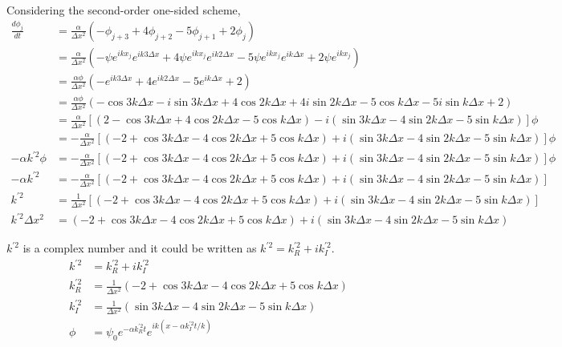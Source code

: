 \documentclass[letterpaper,10pt]{article}
\begin{document}
Considering the second-order one-sided scheme, 
\begin{align*}
  \frac{d\phi_j}{dt}&=\frac{\alpha}{\Delta x^2}\left(-\phi_{j+3}+4\phi_{j+2}-5\phi_{j+1}+2\phi_j\right)\\
  &=\frac{\alpha}{\Delta x^2}\left(-\psi e^{ikx_j}e^{ik3\Delta x}+4\psi e^{ikx_j}e^{ik2\Delta x}-5\psi e^{ikx_j}e^{ik\Delta x}+2\psi e^{ikx_j}\right)\\
  &=\frac{\alpha \phi}{\Delta x^2}\left(-e^{ik3\Delta x}+4e^{ik2\Delta x}-5e^{ik\Delta x}+2\right)\\
  &=\frac{\alpha \phi}{\Delta x^2}\left(-\cos 3k\Delta x-i\sin 3k\Delta x+4\cos 2k\Delta x +4i\sin 2k\Delta x - 5\cos k\Delta x -5i\sin k\Delta x +2\right)\\
  &=\frac{\alpha}{\Delta x^2}\left[\left(2-\cos3k\Delta x+4\cos 2k\Delta x-5\cos k\Delta x\right)-i\left(\sin 3k\Delta x -4\sin 2k\Delta x - 5\sin k\Delta x\right)\right]\phi\\
  &=-\frac{\alpha}{\Delta x^2}\left[\left(-2+\cos3k\Delta x-4\cos 2k\Delta x+5\cos k\Delta x\right)+i\left(\sin 3k\Delta x -4\sin 2k\Delta x - 5\sin k\Delta x\right)\right]\phi\\
  -\alpha k^{'2} \phi &=-\frac{\alpha}{\Delta x^2}\left[\left(-2+\cos3k\Delta x-4\cos 2k\Delta x+5\cos k\Delta x\right)+i\left(\sin 3k\Delta x -4\sin 2k\Delta x - 5\sin k\Delta x\right)\right]\phi\\
  -\alpha k^{'2} &=-\frac{\alpha}{\Delta x^2}\left[\left(-2+\cos3k\Delta x-4\cos 2k\Delta x+5\cos k\Delta x\right)+i\left(\sin 3k\Delta x -4\sin 2k\Delta x - 5\sin k\Delta x\right)\right]\\
  k^{'2}&=\frac{1}{\Delta x^2}\left[\left(-2+\cos3k\Delta x-4\cos 2k\Delta x+5\cos k\Delta x\right)+i\left(\sin 3k\Delta x -4\sin 2k\Delta x - 5\sin k\Delta x\right)\right]\\
  k^{'2}\Delta x^2 &=\left(-2+\cos3k\Delta x-4\cos 2k\Delta x+5\cos k\Delta x\right)+i\left(\sin 3k\Delta x -4\sin 2k\Delta x - 5\sin k\Delta x\right)
\end{align*}

$k^{'2}$ is a complex number and it could be written as $k^{'2}=k^{'2}_R+ik^{'2}_I$. 
\begin{align*}
  k^{'2}&=k^{'2}_R+ik^{'2}_I\\
  k^{'2}_R&=\frac{1}{\Delta x^2}\left(-2+\cos3k\Delta x-4\cos 2k\Delta x+5\cos k\Delta x\right)\\
  k^{'2}_I&=\frac{1}{\Delta x^2}\left(\sin 3k\Delta x -4\sin 2k\Delta x - 5\sin k\Delta x\right)\\
  \phi &= \psi_0 e^{-\alpha k^{'2}_R t}e^{ik(x-\alpha k^{'2}_I t/k)}
\end{align*}
\end{document}
